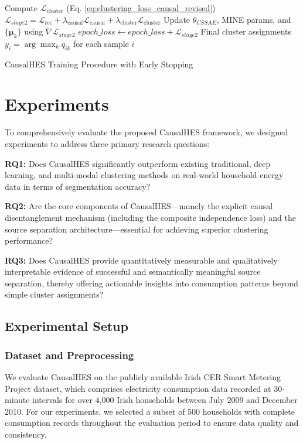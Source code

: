 \documentclass[journal]{IEEEtran}
\begin{document}
\begin{algorithm}[t]
{{    Compute $\mathcal{L}_{\text{cluster}}$ (Eq. \ref{eq:clustering_loss_causal_revised})\;
    $\mathcal{L}_{stage2} = \mathcal{L}_{\text{rec}} + \lambda_{\text{causal}}\mathcal{L}_{\text{causal}} + \lambda_{\text{cluster}}\mathcal{L}_{\text{cluster}}$\;
    Update $\theta_{CSSAE}$, MINE params, and $\{\boldsymbol{\mu}_k\}$ using $\nabla \mathcal{L}_{stage2}$\;
    $epoch\_loss \leftarrow epoch\_loss + \mathcal{L}_{stage2}$\;
  }
}
\Return Final cluster assignments $y_i = \arg\max_k q_{ik}$ for each sample $i$
\caption{CausalHES Training Procedure with Early Stopping}
\label{alg:causal_hes_training_revised}
\end{algorithm}

\section{Experiments}
\label{sec:experiments}
To comprehensively evaluate the proposed CausalHES framework, we designed experiments to address three primary research questions:

\noindent\textbf{RQ1:} Does CausalHES significantly outperform existing traditional, deep learning, and multi-modal clustering methods on real-world household energy data in terms of segmentation accuracy?

\noindent\textbf{RQ2:} Are the core components of CausalHES—namely the explicit causal disentanglement mechanism (including the composite independence loss) and the source separation architecture—essential for achieving superior clustering performance?

\noindent\textbf{RQ3:} Does CausalHES provide quantitatively measurable and qualitatively interpretable evidence of successful and semantically meaningful source separation, thereby offering actionable insights into consumption patterns beyond simple cluster assignments?

\subsection{Experimental Setup}
\label{sec:experimental_setup}

\subsubsection{Dataset and Preprocessing}
We evaluate CausalHES on the publicly available Irish CER Smart Metering Project dataset, which comprises electricity consumption data recorded at 30-minute intervals for over 4,000 Irish households between July 2009 and December 2010. For our experiments, we selected a subset of 500 households with complete consumption records throughout the evaluation period to ensure data quality and consistency.
\end{document}

